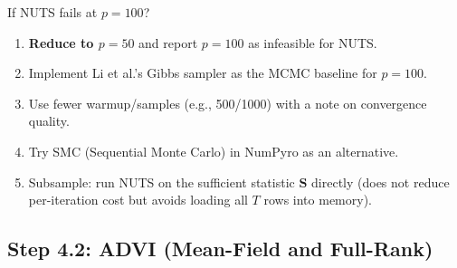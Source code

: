 \documentclass[11pt,a4paper]{article}
\begin{document}
\begin{decision}{If NUTS fails at $p=100$?}
\begin{enumerate}[nosep]
  \item[\textbf{(a)}] \textbf{Reduce to $p=50$} and report $p=100$ as infeasible for NUTS.
  \item[(b)] Implement Li et al.'s Gibbs sampler as the MCMC baseline for $p=100$.
  \item[(c)] Use fewer warmup/samples (e.g., 500/1000) with a note on convergence quality.
  \item[(d)] Try SMC (Sequential Monte Carlo) in NumPyro as an alternative.
  \item[(e)] Subsample: run NUTS on the sufficient statistic $\bm{S}$ directly (does not reduce per-iteration cost but avoids loading all $T$ rows into memory).
\end{enumerate}
\end{decision}

\subsection{Step 4.2: ADVI (Mean-Field and Full-Rank)}
\end{document}
